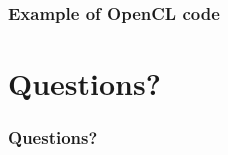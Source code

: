 \documentclass{beamer}
\begin{document}
\begin{frame}
\frametitle{Example of OpenCL code}



\end{frame}

\section{Questions?}
\begin{frame}
  \frametitle{Questions?}
\end{frame}
\end{document}
